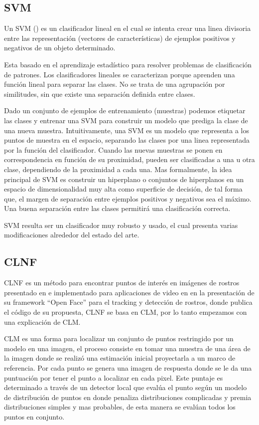 \subsection{\acf{SVM}}
Un \ac{SVM} (\cite{cortes1995support}) es un clasificador lineal en el cual se intenta crear una linea divisoria entre las representación (vectores de características) de ejemplos positivos y negativos de un objeto determinado.

Esta basado en el aprendizaje estadístico para resolver problemas de clasificación de patrones. Los clasificadores lineales se caracterizan porque aprenden una función lineal para separar las clases. No se trata de una agrupación por similitudes, sin que existe una separación definida entre clases.

Dado un conjunto de ejemplos de entrenamiento (muestras) podemos etiquetar las clases y entrenar una SVM para construir un modelo que prediga la clase de una nueva muestra. Intuitivamente, una SVM es un modelo que representa a los puntos de muestra en el espacio, separando las clases por una linea representada por la función del clasificador. Cuando las nuevas muestras se ponen en correspondencia en función de su proximidad, pueden ser clasificadas a una u otra clase, dependiendo de la proximidad a cada una. Mas formalmente, la idea principal de SVM es construir un hiperplano o conjuntos de hiperplanos en un espacio de dimensionalidad muy alta como superficie de decisión, de tal forma que, el margen de separación entre ejemplos positivos y negativos sea el máximo. Una buena separación entre las clases permitirá una clasificación correcta. 

\ac{SVM} resulta ser un clasificador muy robusto y usado, el cual presenta varias modificaciones alrededor del estado del arte.


\subsection{\acf{CLNF}}
\ac{CLNF} es un método para encontrar puntos de interés en imágenes de rostros presentado en \cite{baltrusaitis2013constrained} e implementado para aplicaciones de video en \cite{Baltrusaitis2016} en la presentación de su framework ``Open Face'' para el tracking y detección de rostros, donde publica el código de su propuesta, \ac{CLNF} se basa en \ac{CLM}, por lo tanto empezamos con una explicación de \ac{CLM}.

\ac{CLM} es una forma para localizar un conjunto de puntos restringido por un modelo en una imagen, el proceso consiste en tomar una muestra de una área de la imagen donde se realizó una estimación inicial proyectarla a un marco de referencia. Por cada punto se genera una imagen de respuesta donde se le da una puntuación por tener el punto a localizar en cada pixel. Este puntaje es determinado a través de un detector local que evalúa el punto según un modelo de distribución de puntos en donde penaliza distribuciones complicadas y premia distribuciones simples y mas probables, de esta manera se evalúan todos los puntos en conjunto.

